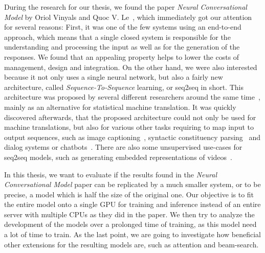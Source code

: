 During the research for our thesis, we found the paper \emph{Neural Conversational Model} by Oriol Vinyals and Quoc V. Le~\cite{Vinyals:2015}, which immediately got our attention for several reasons: First, it was one of the few systems using an end-to-end approach, which means that a single closed system is responsible for the understanding and processing the input as well as for the generation of the responses. We found that an appealing property helps to lower the costs of management, design and integration. On the other hand, we were also interested because it not only uses a single neural network, but also a fairly new architecture, called \emph{Sequence-To-Sequence} learning, or seq2seq in short. This architecture was proposed by several different researchers around the same time~\cite{Sutskever:2014}\cite{Kalchbrenner:2013}\cite{Cho:2014}, mainly as an alternative for statistical machine translation. It was quickly discovered afterwards, that the proposed architecture could not only be used for machine translations, but also for various other tasks requiring to map input to output sequences, such as image captioning~\cite{Xu:2015}, syntactic constituency parsing~\cite{Vinyals:2015:Foreign} and dialog systems or chatbots~\cite{Zivkovic:Trumpbot}\cite{Lison:2016}. There are also some unsupervised use-cases for seq2seq models, such as generating embedded representations of videos~\cite{Nitish:2015}.

In this thesis, we want to evaluate if the results found in the \emph{Neural Conversational Model} paper can be replicated by a much smaller system, or to be precise, a model which is half the size of the original one. Our objective is to fit the entire model onto a single GPU for training and inference instead of  an entire server with multiple CPUs as they did in the paper. We then try to analyze the development of the models over a prolonged time of training, as this model need a lot of time to train. As the last point, we are going to investigate how beneficial other extensions for the resulting models are, such as attention and beam-search.